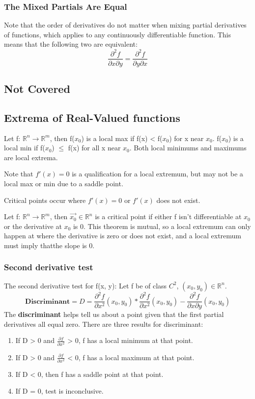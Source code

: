 \documentclass{article}
\begin{document}
\subsubsection{The Mixed Partials Are Equal}
Note that the order of derivatives do not matter when mixing partial derivatives of functions, which applies to any continuously differentiable function. This means that the following two are equivalent:
\[
  \frac{\partial^2 f}{\partial x \partial y} = \frac{\partial^2 f}{\partial y \partial x}
\]



\subsection{Not Covered}
\subsection{Extrema of Real-Valued functions}
Let f: $\mathbb{R}^n \rightarrow \mathbb{R}^m$, then f($x_0$) is a local max if f(x) < f($x_0$) for x near $x_0$. f($x_0$) is a local min if f($x_0$) $\leq$ f(x) for all x near $x_0$.  Both local minimums and maximums are local extrema.\newline

Note that $f'(x) = 0$ is a qualification for a local extremum, but may not be a local max or min due to a saddle point.

Critical points occur where $f'(x) = 0$ or $f'(x)$ does not exist.

Let f: $\mathbb{R}^n \rightarrow \mathbb{R}^m$, then $\vec{x_0} \in \mathbb{R}^n$ is a critical point if either f isn't differentiable at $x_0$ or the derivative at $x_0$ is 0. This theorem is mutual, so a local extremum can only happen at where the derivative is zero or does not exist, and a local extremum must imply thatthe slope is 0.
\subsubsection{Second derivative test}
The second derivative test for f(x, y):
Let f be of class $C^2$, $(x_0,y_0) \in \mathbb{R}^n$.
\[
  \textbf{Discriminant} = D = \frac{\partial^2 f}{\partial x^2}(x_0, y_0) * \frac{\partial^2 f}{\partial x^2}(x_0, y_0) - \frac{\partial^2 f}{\partial x\partial y}(x_0, y_0)
\]
The \textbf{discriminant} helps tell us about a point given that the first partial derivatives all equal zero. There are three results for discriminant:
\begin{enumerate}
  \item If D > 0 and $\frac{\partial f}{\partial x^2} $ > 0, f has a local minimum at that point.
  \item If D > 0 and $\frac{\partial f}{\partial x^2} $ < 0, f has a local maximum at that point.
  \item If D < 0, then f has a saddle point at that point.
  \item If D = 0, test is inconclusive.
\end{enumerate}
\end{document}
